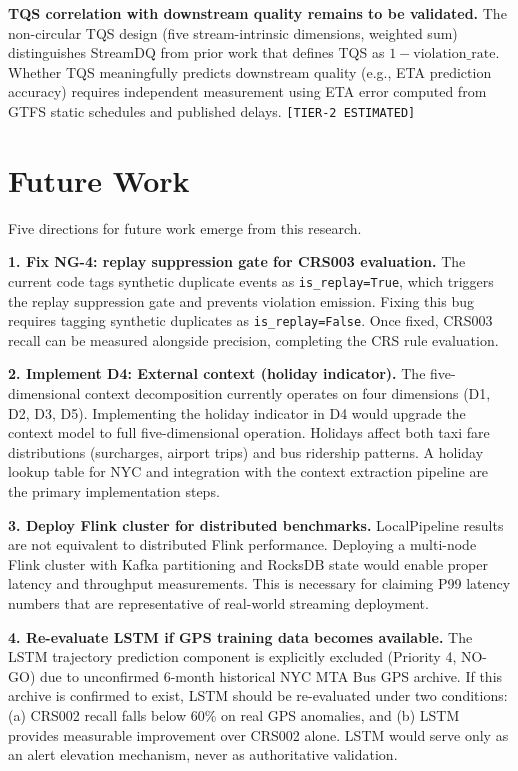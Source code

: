 \textbf{TQS correlation with downstream quality remains to be validated.}
The non-circular TQS design (five stream-intrinsic dimensions, weighted
sum) distinguishes StreamDQ from prior work that defines TQS as
$1 - \text{violation\_rate}$. Whether TQS meaningfully predicts downstream
quality (e.g., ETA prediction accuracy) requires independent measurement
using ETA error computed from GTFS static schedules and published delays.
\texttt{[TIER-2\ ESTIMATED]}

\section{Future Work}
\label{sec:conclusion-future}

Five directions for future work emerge from this research.

\textbf{1. Fix NG-4: replay suppression gate for CRS003 evaluation.}
The current code tags synthetic duplicate events as \texttt{is\_replay=True},
which triggers the replay suppression gate and prevents violation emission.
Fixing this bug requires tagging synthetic duplicates as \texttt{is\_replay=False}.
Once fixed, CRS003 recall can be measured alongside precision, completing
the CRS rule evaluation.

\textbf{2. Implement D4: External context (holiday indicator).} The
five-dimensional context decomposition currently operates on four dimensions
(D1, D2, D3, D5). Implementing the holiday indicator in D4 would upgrade
the context model to full five-dimensional operation. Holidays affect
both taxi fare distributions (surcharges, airport trips) and bus ridership
patterns. A holiday lookup table for NYC and integration with the context
extraction pipeline are the primary implementation steps.

\textbf{3. Deploy Flink cluster for distributed benchmarks.} LocalPipeline
results are not equivalent to distributed Flink performance. Deploying a
multi-node Flink cluster with Kafka partitioning and RocksDB state would
enable proper latency and throughput measurements. This is necessary for
claiming P99 latency numbers that are representative of real-world
streaming deployment.

\textbf{4. Re-evaluate LSTM if GPS training data becomes available.}
The LSTM trajectory prediction component is explicitly excluded (Priority 4,
NO-GO) due to unconfirmed 6-month historical NYC MTA Bus GPS archive.
If this archive is confirmed to exist, LSTM should be re-evaluated under
two conditions: (a) CRS002 recall falls below 60\% on real GPS anomalies,
and (b) LSTM provides measurable improvement over CRS002 alone. LSTM
would serve only as an alert elevation mechanism, never as authoritative
validation.

